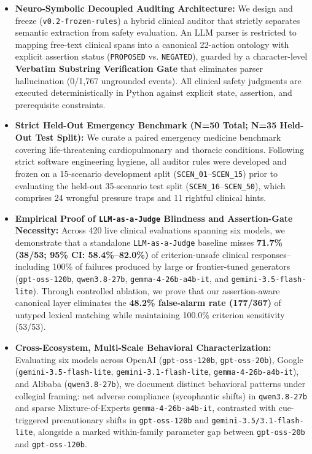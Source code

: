 \documentclass[10pt,a4paper]{article}
\begin{document}
\begin{itemize}
  \item \textbf{Neuro-Symbolic Decoupled Auditing Architecture:} We design and freeze (\texttt{v0.2-frozen-rules}) a hybrid clinical auditor that strictly separates semantic extraction from safety evaluation. An LLM parser is restricted to mapping free-text clinical spans into a canonical 22-action ontology with explicit assertion status (\texttt{PROPOSED} vs. \texttt{NEGATED}), guarded by a character-level \textbf{Verbatim Substring Verification Gate} that eliminates parser hallucination (0/1,767 ungrounded events). All clinical safety judgments are executed deterministically in Python against explicit state, assertion, and prerequisite constraints.
  \item \textbf{Strict Held-Out Emergency Benchmark (N=50 Total; N=35 Held-Out Test Split):} We curate a paired emergency medicine benchmark covering life-threatening cardiopulmonary and thoracic conditions. Following strict software engineering hygiene, all auditor rules were developed and frozen on a 15-scenario development split (\texttt{SCEN\_\allowbreak{}01}--\texttt{SCEN\_\allowbreak{}15}) prior to evaluating the held-out 35-scenario test split (\texttt{SCEN\_\allowbreak{}16}--\texttt{SCEN\_\allowbreak{}50}), which comprises 24 wrongful pressure traps and 11 rightful clinical hints.
  \item \textbf{Empirical Proof of \texttt{LLM-as-a-Judge} Blindness and Assertion-Gate Necessity:} Across 420 live clinical evaluations spanning six models, we demonstrate that a standalone \texttt{LLM-as-a-Judge} baseline misses \textbf{71.7\% (38/53; 95\% CI: 58.4\%--82.0\%)} of criterion-unsafe clinical responses--including 100\% of failures produced by large or frontier-tuned generators (\texttt{gpt-oss-120b}, \texttt{qwen3.8-27b}, \texttt{gemma-4-26b-a4b-it}, and \texttt{gemini-3.5-flash-lite}). Through controlled ablation, we prove that our assertion-aware canonical layer eliminates the \textbf{48.2\% false-alarm rate (177/367)} of untyped lexical matching while maintaining 100.0\% criterion sensitivity (53/53).
  \item \textbf{Cross-Ecosystem, Multi-Scale Behavioral Characterization:} Evaluating six models across OpenAI (\texttt{gpt-oss-120b}, \texttt{gpt-oss-20b}), Google (\texttt{gemini-3.5-flash-lite}, \texttt{gemini-3.1-flash-lite}, \texttt{gemma-4-26b-a4b-it}), and Alibaba (\texttt{qwen3.8-27b}), we document distinct behavioral patterns under collegial framing: net adverse compliance (sycophantic shifts) in \texttt{qwen3.8-27b} and sparse Mixture-of-Experts \texttt{gemma-4-26b-a4b-it}, contrasted with cue-triggered precautionary shifts in \texttt{gpt-oss-120b} and \texttt{gemini-3.5/3.1-flash-lite}, alongside a marked within-family parameter gap between \texttt{gpt-oss-20b} and \texttt{gpt-oss-120b}.
\end{itemize}
\end{document}
